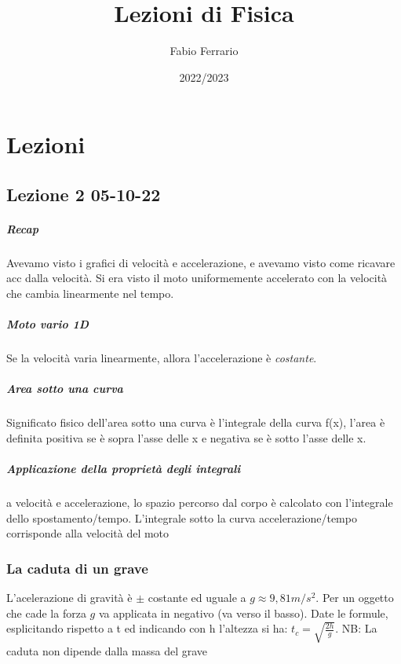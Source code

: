 \documentclass[12pt, a4paper, openany]{book}
\begin{document}
\title{Lezioni di Fisica}
\author{Fabio Ferrario}
\date{2022/2023}
\maketitle


\chapter{Lezioni}
\section*{Lezione 2 05-10-22}
\paragraph*{Recap} Avevamo visto i grafici di velocità e accelerazione, e avevamo visto come ricavare acc dalla velocità.
Si era visto il moto uniformemente accelerato con la velocità che cambia linearmente nel tempo.

\paragraph*{Moto vario 1D} Se la velocità varia linearmente, allora l'accelerazione è \emph{costante}.
\paragraph*{Area sotto una curva} Significato fisico dell'area sotto una curva è l'integrale della curva f(x), l'area è definita positiva se è sopra l'asse delle x e negativa se è sotto l'asse delle x.
\paragraph*{Applicazione della proprietà degli integrali} a velocità e accelerazione, lo spazio percorso dal corpo è calcolato con l'integrale dello spostamento/tempo.
L'integrale sotto la curva accelerazione/tempo corrisponde alla velocità del moto
\subsection*{La caduta di un grave} L'acelerazione di gravità è $\pm$ costante ed uguale a $g\approx 9,81m/s^2$. Per un oggetto che cade la forza $g$ va applicata in negativo (va verso il basso).
Date le formule, esplicitando rispetto a t ed indicando con h l'altezza si ha: $t_c=\sqrt{\frac{2h}{g}}$. NB: La caduta non dipende dalla massa del grave
\end{document}
